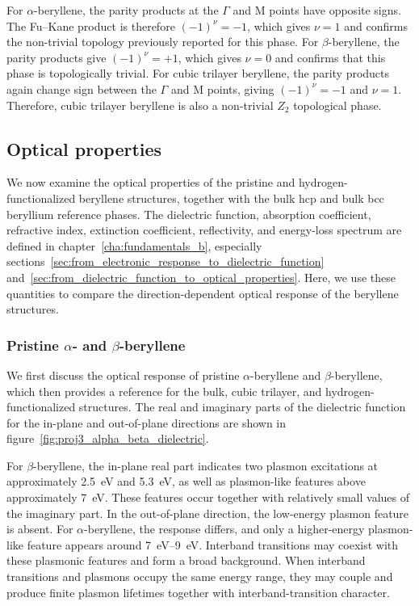 For $\alpha$-beryllene,
the parity products at the $\Gamma$ and $\mathrm{M}$ points have opposite signs.
The Fu--Kane product is therefore $(-1)^{\nu}=-1$,
which gives $\nu=1$ and confirms the non-trivial topology previously reported for this phase.
For $\beta$-beryllene,
the parity products give $(-1)^{\nu}=+1$,
which gives $\nu=0$ and confirms that this phase is topologically trivial.
For cubic trilayer beryllene,
the parity products again change sign between the $\Gamma$ and $\mathrm{M}$ points,
giving $(-1)^{\nu}=-1$ and $\nu=1$.
Therefore,
cubic trilayer beryllene is also a non-trivial $Z_{2}$ topological phase.

\subsection{Optical properties}
\label{3_optical_properties}

We now examine the optical properties of the pristine and hydrogen-functionalized beryllene structures,
together with the bulk hcp and bulk bcc beryllium reference phases.
The dielectric function,
absorption coefficient,
refractive index,
extinction coefficient,
reflectivity,
and energy-loss spectrum are defined in chapter~\ref{cha:fundamentals_b},
especially sections~\ref{sec:from_electronic_response_to_dielectric_function} and~\ref{sec:from_dielectric_function_to_optical_properties}.
Here,
we use these quantities to compare the direction-dependent optical response of the beryllene structures.

\subsubsection{Pristine $\alpha$- and $\beta$-beryllene}
\label{3_optical_alpha_beta}

We first discuss the optical response of pristine $\alpha$-beryllene and $\beta$-beryllene,
which then provides a reference for the bulk,
cubic trilayer,
and hydrogen-functionalized structures.
The real and imaginary parts of the dielectric function for the in-plane and out-of-plane directions are shown in figure~\ref{fig:proj3_alpha_beta_dielectric}.

For $\beta$-beryllene,
the in-plane real part indicates two plasmon excitations at approximately \qty{2.5}{\electronvolt} and \qty{5.3}{\electronvolt},
as well as plasmon-like features above approximately \qty{7}{\electronvolt}.
These features occur together with relatively small values of the imaginary part.
In the out-of-plane direction,
the low-energy plasmon feature is absent.
For $\alpha$-beryllene,
the response differs,
and only a higher-energy plasmon-like feature appears around \qtyrange{7}{9}{\electronvolt}.
Interband transitions may coexist with these plasmonic features and form a broad background.
When interband transitions and plasmons occupy the same energy range,
they may couple and produce finite plasmon lifetimes together with interband-transition character.

